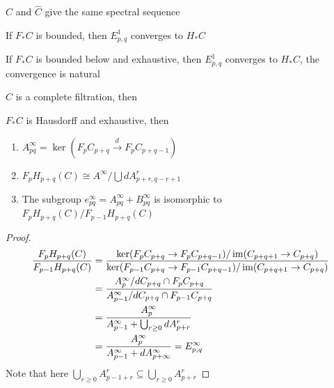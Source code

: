 \documentclass[main]{subfiles}
\begin{document}
\begin{lemma}
$C$ and $\widehat C$ give the same spectral sequence
\end{lemma}

\begin{theorem}
If $F_*C$ is bounded, then $E^1_{p,q}$ converges to $H_*C$ \par
If $F_*C$ is bounded below and exhaustive, then $E^1_{p,q}$ converges to $H_*C$, the convergence is natural
\end{theorem}

\begin{theorem}
$C$ is a complete filtration, then
\begin{center}
\end{center}
\end{theorem}

\begin{lemma}
$F_*C$ is Hausdorff and exhaustive, then
\begin{enumerate}[label=\arabic*., leftmargin=*]
\item $A^\infty_{pq}=\ker(F_pC_{p+q}\xrightarrow dF_{p}C_{p+q-1})$
\item $F_pH_{p+q}(C)\cong A^\infty/\bigcup dA^r_{p+r,q-r+1}$
\item The subgroup $e^\infty_{pq}=A^\infty_{pq}+B^\infty_{pq}$ is isomorphic to $F_pH_{p+q}(C)/F_{p-1}H_{p+q}(C)$
\end{enumerate}
\end{lemma}

\begin{proof}
\begin{align*}
\frac{F_pH_{p+q}(C)}{F_{p-1}H_{p+q}(C)}&=\frac{\ker(F_pC_{p+q}\to F_pC_{p+q-1})/\operatorname{im}(C_{p+q+1}\to C_{p+q})}{\ker(F_{p-1}C_{p+q}\to F_{p-1}C_{p+q-1})/\operatorname{im}(C_{p+q+1}\to C_{p+q})} \\
&=\frac{A_{p}^\infty/dC_{p+q}\cap F_pC_{p+q}}{A_{p-1}^\infty/dC_{p+q}\cap F_{p-1}C_{p+q}} \\
&=\frac{A_{p}^\infty}{A_{p-1}^\infty+\bigcup_{r\geq0}dA_{p+r}^r} \\
&=\frac{A_{p}^\infty}{A_{p-1}^\infty+dA_{p+\infty}^\infty}=E_{p,q}^\infty
\end{align*}
Note that here $\bigcup_{r\geq0}A_{p-1+r}^r\subseteq\bigcup_{r\geq0}A_{p+r}^r$
\end{proof}


\newpage
\end{document}

